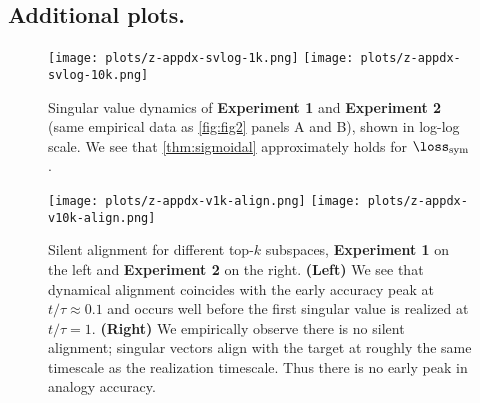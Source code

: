 \subsection{Additional plots.}

\begin{figure*}[!ht]
    \begin{center}
    \texttt{[image: plots/z-appdx-svlog-1k.png]}
    \texttt{[image: plots/z-appdx-svlog-10k.png]}        
    \end{center}
    \caption{
    Singular value dynamics of \textbf{Experiment 1} and \textbf{Experiment 2} (same empirical data as \cref{fig:fig2} panels A and B), shown in log-log scale. We see that \cref{thm:sigmoidal} approximately holds for $\losssym$.
    }
\end{figure*}

\begin{figure*}[!ht]
    \begin{center}
    \texttt{[image: plots/z-appdx-v1k-align.png]} 
    \texttt{[image: plots/z-appdx-v10k-align.png]}       
    \end{center}
    \caption{
    Silent alignment for different top-$k$ subspaces, \textbf{Experiment 1} on the left and \textbf{Experiment 2} on the right. \textbf{(Left)} We see that dynamical alignment coincides with the early accuracy peak at $t/\tau\approx 0.1$ and occurs well before the first singular value is realized at $t/\tau=1$. \textbf{(Right)} We empirically observe there is no silent alignment; singular vectors align with the target at roughly the same timescale as the realization timescale. Thus there is no early peak in analogy accuracy.
    }
\label{fig:z-appdx-align}
\end{figure*}

